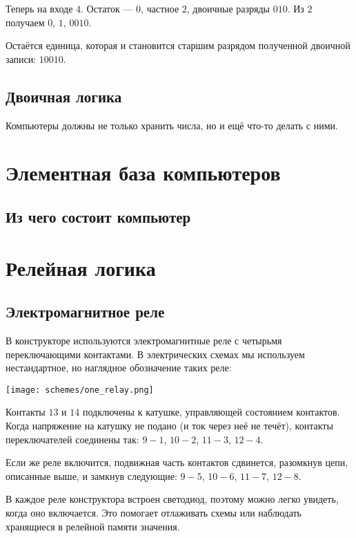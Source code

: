 Теперь на входе $4$. Остаток --- $0$, частное $2$, двоичные разряды $010$.
Из $2$ получаем $0$, $1$, $0010$.

Остаётся единица, которая и становится старшим разрядом полученной двоичной записи: $10010$.

\section{Двоичная логика}

Компьютеры должны не только хранить числа, но и ещё что-то делать с ними.

\chapter{Элементная база компьютеров}

\section{Из чего состоит компьютер}


\chapter{Релейная логика}

\section{Электромагнитное реле}

В конструкторе используются электромагнитные реле с четырьмя
переключающими контактами. В электрических схемах
мы используем нестандартное, но наглядное обозначение таких реле:

\begin{center}
\texttt{[image: schemes/one\_relay.png]}
\end{center}


Контакты $13$ и $14$ подключены к катушке, управляющей состоянием контактов.
Когда напряжение на катушку не подано (и ток через неё не течёт),
контакты переключателей соединены так: $9-1$, $10-2$, $11-3$, $12-4$.

Если же реле включится, подвижная часть контактов сдвинется, разомкнув цепи,
описанные выше, и замкнув следующие: $9-5$, $10-6$, $11-7$, $12-8$.

В каждое реле конструктора встроен светодиод, поэтому можно легко увидеть,
когда оно включается. Это помогает отлаживать схемы или наблюдать
хранящиеся в релейной памяти значения.

